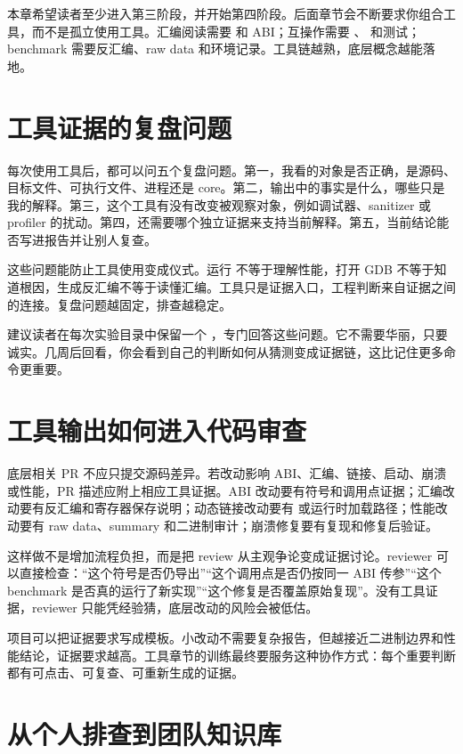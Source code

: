 本章希望读者至少进入第三阶段，并开始第四阶段。后面章节会不断要求你组合工具，而不是孤立使用工具。汇编阅读需要  和 ABI；互操作需要 、 和测试；benchmark 需要反汇编、raw data 和环境记录。工具链越熟，底层概念越能落地。

\section{工具证据的复盘问题}

每次使用工具后，都可以问五个复盘问题。第一，我看的对象是否正确，是源码、目标文件、可执行文件、进程还是 core。第二，输出中的事实是什么，哪些只是我的解释。第三，这个工具有没有改变被观察对象，例如调试器、sanitizer 或 profiler 的扰动。第四，还需要哪个独立证据来支持当前解释。第五，当前结论能否写进报告并让别人复查。

这些问题能防止工具使用变成仪式。运行  不等于理解性能，打开 GDB 不等于知道根因，生成反汇编不等于读懂汇编。工具只是证据入口，工程判断来自证据之间的连接。复盘问题越固定，排查越稳定。

建议读者在每次实验目录中保留一个 ，专门回答这些问题。它不需要华丽，只要诚实。几周后回看，你会看到自己的判断如何从猜测变成证据链，这比记住更多命令更重要。

\section{工具输出如何进入代码审查}

底层相关 PR 不应只提交源码差异。若改动影响 ABI、汇编、链接、启动、崩溃或性能，PR 描述应附上相应工具证据。ABI 改动要有符号和调用点证据；汇编改动要有反汇编和寄存器保存说明；动态链接改动要有  或运行时加载路径；性能改动要有 raw data、summary 和二进制审计；崩溃修复要有复现和修复后验证。

这样做不是增加流程负担，而是把 review 从主观争论变成证据讨论。reviewer 可以直接检查：“这个符号是否仍导出”“这个调用点是否仍按同一 ABI 传参”“这个 benchmark 是否真的运行了新实现”“这个修复是否覆盖原始复现”。没有工具证据，reviewer 只能凭经验猜，底层改动的风险会被低估。

项目可以把证据要求写成模板。小改动不需要复杂报告，但越接近二进制边界和性能结论，证据要求越高。工具章节的训练最终要服务这种协作方式：每个重要判断都有可点击、可复查、可重新生成的证据。

\section{从个人排查到团队知识库}

